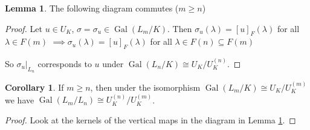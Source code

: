 \documentclass[a4paper]{article}
\theoremstyle{definition}
\theoremstyle{default}
\newtheorem{lemma}[definition]{Lemma}
\newtheorem{corollary}[definition]{Corollary}
\theoremstyle{remark}
\DeclareMathOperator{\Gal}{Gal}
\begin{document}
\begin{lemma}
	The following diagram commutes ($m \geq n$)
	\begin{center}
	\end{center}
	\label{130}
\end{lemma}
\begin{proof}
	Let $u \in U_K$, $\sigma = \sigma_u \in \Gal(L_m/K)$.
	Then $\sigma_u(\lambda) = [u]_F(\lambda)$ for all $\lambda \in F(m)$
	$\implies \sigma_u(\lambda) = [u]_F(\lambda)$ for all $\lambda \in F(n) \subseteq F(m)$
	
	So $\sigma_u|_{L_n}$ corresponds to $u$ under $\Gal(L_n/K) \cong U_K/U_K^{(n)}$.
\end{proof}

\begin{corollary}
	If $m \geq n$, then under the isomorphism $\Gal(L_m/K) \cong U_K/U_K^{(m)}$
	we have $\Gal(L_m/L_n) \cong U_K^{(n)}/U_K^{(m)}$.
	\label{131}
\end{corollary}
\begin{proof}
	Look at the kernels of the vertical maps in the diagram in Lemma \ref{130}.
\end{proof}
\end{document}
